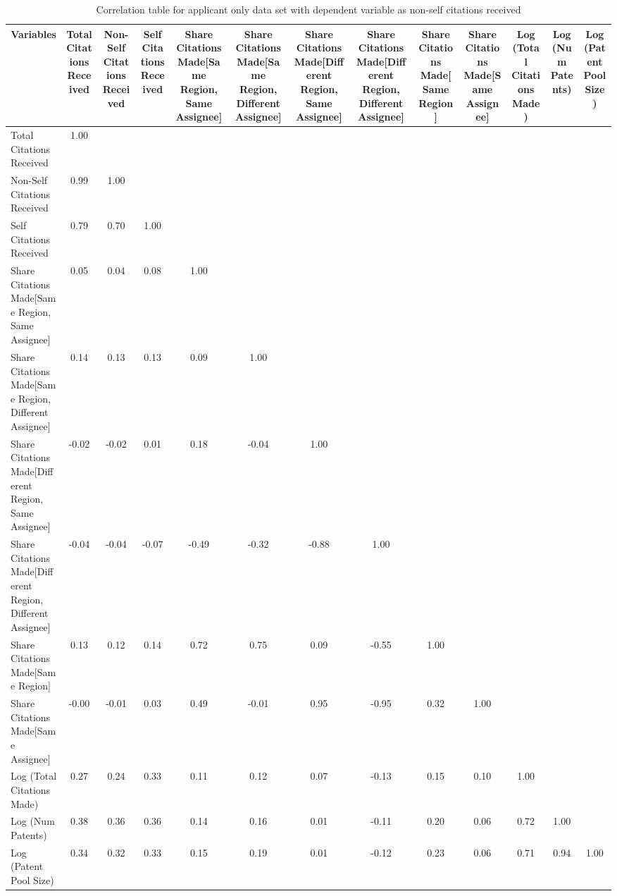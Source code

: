 \begin{table}[htbp]\centering \caption{Correlation table for applicant only data set with dependent variable as non-self citations received \label{a.ncorrelation}}
\begin{tabular}{l  c  c  c  c  c  c  c  c  c  c  c  c }\hline\hline
\multicolumn{1}{c}{Variables} &Total Citations Received&Non-Self Citations Received&Self Citations Received&Share Citations Made[Same Region, Same Assignee]&Share Citations Made[Same Region, Different Assignee]&Share Citations Made[Different Region, Same Assignee]&Share Citations Made[Different Region, Different Assignee]&Share Citations Made[Same Region]&Share Citations Made[Same Assignee]&Log (Total Citations Made)&Log (Num Patents)&Log (Patent Pool Size)\\ \hline
Total Citations Received&1.00\\
Non-Self Citations Received&0.99&1.00\\
Self Citations Received&0.79&0.70&1.00\\
Share Citations Made[Same Region, Same Assignee]&0.05&0.04&0.08&1.00\\
Share Citations Made[Same Region, Different Assignee]&0.14&0.13&0.13&0.09&1.00\\
Share Citations Made[Different Region, Same Assignee]&-0.02&-0.02&0.01&0.18&-0.04&1.00\\
Share Citations Made[Different Region, Different Assignee]&-0.04&-0.04&-0.07&-0.49&-0.32&-0.88&1.00\\
Share Citations Made[Same Region]&0.13&0.12&0.14&0.72&0.75&0.09&-0.55&1.00\\
Share Citations Made[Same Assignee]&-0.00&-0.01&0.03&0.49&-0.01&0.95&-0.95&0.32&1.00\\
Log (Total Citations Made)&0.27&0.24&0.33&0.11&0.12&0.07&-0.13&0.15&0.10&1.00\\
Log (Num Patents)&0.38&0.36&0.36&0.14&0.16&0.01&-0.11&0.20&0.06&0.72&1.00\\
Log (Patent Pool Size)&0.34&0.32&0.33&0.15&0.19&0.01&-0.12&0.23&0.06&0.71&0.94&1.00\\
\hline \hline 
 \end{tabular}
\end{table}
